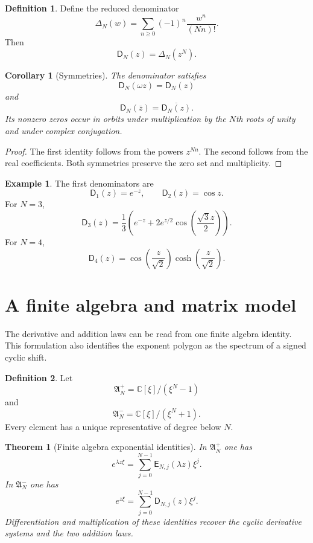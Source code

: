 \documentclass[11pt]{article}
\newtheorem{theorem}{Theorem}[section]
\newtheorem{corollary}[corollary]{Corollary}
\theoremstyle{definition}
\newtheorem{definition}[definition]{Definition}
\newtheorem{example}[example]{Example}
\theoremstyle{remark}
\newcommand{\CC}{\mathbb C}
\newcommand{\Dfun}{\mathsf D}
\newcommand{\Efun}{\mathsf E}
\begin{document}
\begin{definition}\label{def:reduced_denominator}
Define the reduced denominator
\[
\Delta_N(w)
=
\sum_{n\geq0}(-1)^n\frac{w^n}{(Nn)!}.
\]
Then
\[
\Dfun_N(z)=\Delta_N(z^N).
\]
\end{definition}

\begin{corollary}[Symmetries]\label{cor:denominator_symmetries}
The denominator satisfies
\[
\Dfun_N(\omega z)=\Dfun_N(z)
\]
and
\[
\Dfun_N(\overline z)=\overline{\Dfun_N(z)}.
\]
Its nonzero zeros occur in orbits under multiplication by the $N$th roots of unity and under complex conjugation.
\end{corollary}

\begin{proof}
The first identity follows from the powers $z^{Nn}$.  The second follows from the real coefficients.  Both symmetries preserve the zero set and multiplicity.
\end{proof}

\begin{example}\label{ex:small_denominators}
The first denominators are
\[
\Dfun_1(z)=e^{-z},
\qquad
\Dfun_2(z)=\cos z.
\]
For $N=3$,
\[
\Dfun_3(z)
=
\frac13\left(
e^{-z}
+2e^{z/2}\cos\left(\frac{\sqrt3z}{2}\right)
\right).
\]
For $N=4$,
\[
\Dfun_4(z)
=
\cos\left(\frac z{\sqrt2}\right)
\cosh\left(\frac z{\sqrt2}\right).
\]
\end{example}

\section{A finite algebra and matrix model}\label{sec:finite_algebra}

The derivative and addition laws can be read from one finite algebra identity.  This formulation also identifies the exponent polygon as the spectrum of a signed cyclic shift.

\begin{definition}\label{def:cyclic_algebras}
Let
\[
\mathfrak A_N^+=\CC[\xi]/(\xi^N-1)
\]
and
\[
\mathfrak A_N^-=\CC[\xi]/(\xi^N+1).
\]
Every element has a unique representative of degree below $N$.
\end{definition}

\begin{theorem}[Finite algebra exponential identities]\label{thm:finite_algebra_exponentials}
In $\mathfrak A_N^+$ one has
\[
e^{\lambda z\xi}
=
\sum_{j=0}^{N-1}\Efun_{N,j}(\lambda z)\xi^j.
\]
In $\mathfrak A_N^-$ one has
\[
e^{z\xi}
=
\sum_{j=0}^{N-1}\Dfun_{N,j}(z)\xi^j.
\]
Differentiation and multiplication of these identities recover the cyclic derivative systems and the two addition laws.
\end{theorem}
\end{document}
